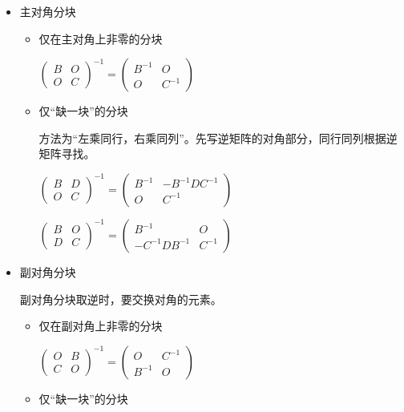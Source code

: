 \begin{itemize}
    \item 主对角分块
    \begin{itemize}
        \item 仅在主对角上非零的分块
        
        $ \begin{pmatrix}
            B&O\\O&C
            \end{pmatrix}^{-1} = \begin{pmatrix}
                B^{-1}&O\\O&C^{-1}
            \end{pmatrix} $ 
        \item 仅“缺一块”的分块
        
        方法为“左乘同行，右乘同列”。先写逆矩阵的对角部分，同行同列根据逆矩阵寻找。

        $ \begin{pmatrix}
        B & D  \\ O & C   
        \end{pmatrix}^{-1} = 
        \begin{pmatrix}
        B^{-1} & -B^{-1}DC^{-1} \\ O & C^{-1}
        \end{pmatrix} $ 
        
        $\begin{pmatrix}
        B & O \\ D & C   
        \end{pmatrix}^{-1} = 
        \begin{pmatrix}
        B^{-1} & O \\ -C^{-1}DB^{-1} & C^{-1}
        \end{pmatrix} $ 
    \end{itemize}

    \item 副对角分块
    
    副对角分块取逆时，要交换对角的元素。
    \begin{itemize}
        \item 仅在副对角上非零的分块
        
        $ \begin{pmatrix}
            O&B\\C&O
        \end{pmatrix}^{-1} = 
        \begin{pmatrix}
            O & C^{-1} \\ B^{-1} & O
        \end{pmatrix} $ 
        \item 仅“缺一块”的分块
        

\end{itemize}
\end{itemize}
